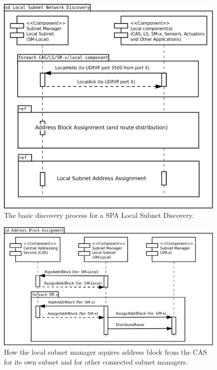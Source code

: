 \begin{figure}[h]
    \centering
    \includegraphics[width=\textwidth]{figures/vn_local_subnet_network_discovery}
    \caption{The basic discovery process for a SPA Local Subnet Discovery.}
    \label{fig:appendix_vn_local_subnet_network_discovery}
\end{figure}

\begin{figure}[h]
    \centering
    \includegraphics[width=\textwidth]{figures/vn_address_block_assignment}
    \caption{How the local subnet manager aquires address block from the CAS
    for its own subnet and for other connected subnet managers.}
    \label{fig:appendix_vn_address_block_assignment}
\end{figure}

